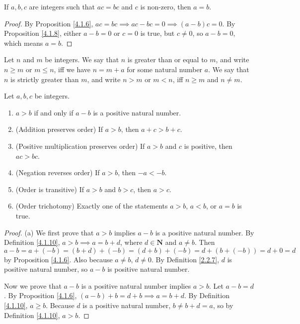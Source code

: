 \begin{corollary}\label{4.1.9}
    If \(a, b, c\) are integers such that \(ac = bc\) and \(c\) is non-zero, then \(a = b\).
\end{corollary}

\begin{proof}
    By Proposition \ref{4.1.6}, \(ac = bc \implies ac - bc = 0 \implies (a - b)c = 0\).
    By Proposition \ref{4.1.8}, either \(a - b = 0\) or \(c = 0\) is true, but \(c \neq 0\), so \(a - b = 0\), which means \(a = b\).
\end{proof}

\begin{definition}\label{4.1.10}
    Let \(n\) and \(m\) be integers.
    We say that \(n\) is greater than or equal to \(m\), and write \(n \geq m\) or \(m \leq n\), iff we have \(n = m + a\) for some natural number \(a\).
    We say that \(n\) is strictly greater than \(m\), and write \(n > m\) or \(m < n\), iff \(n \geq m\) and \(n \neq m\).
\end{definition}

\begin{lemma}\label{4.1.11}
    Let \(a, b, c\) be integers.
    \begin{enumerate}
        \item \(a > b\) if and only if \(a - b\) is a positive natural number.
        \item (Addition preserves order) If \(a > b\), then \(a + c > b + c\).
        \item (Positive multiplication preserves order) If \(a > b\) and \(c\) is positive, then \(ac > bc\).
        \item (Negation reverses order) If \(a > b\), then \(-a < -b\).
        \item (Order is transitive) If \(a > b\) and \(b > c\), then \(a > c\).
        \item (Order trichotomy) Exactly one of the statements \(a > b\), \(a < b\), or \(a = b\) is true.
    \end{enumerate}
\end{lemma}

\begin{proof}{(a)}
    We first prove that \(a > b\) implies \(a - b\) is a positive natural number.
    By Definition \ref{4.1.10}, \(a > b \implies a = b + d\), where \(d \in \mathbf{N}\) and \(a \neq b\).
    Then \(a - b = a + (-b) = (b + d) + (-b) = (d + b) + (-b) = d + (b + (-b)) = d + 0 = d\) by Proposition \ref{4.1.6}.
    Also because \(a \neq b\), \(d \neq 0\).
    By Definition \ref{2.2.7}, \(d\) is positive natural number, so \(a - b\) is positive natural number.

    Now we prove that \(a - b\) is a positive natural number implies \(a > b\).
    Let \(a - b = d\).
    By Proposition \ref{4.1.6}, \((a - b) + b = d + b \implies a = b + d\).
    By Definition \ref{4.1.10}, \(a \geq b\).
    Because \(d\) is a positive natural number, \(b \neq b + d = a\), so by Definition \ref{4.1.10}, \(a > b\).
\end{proof}


